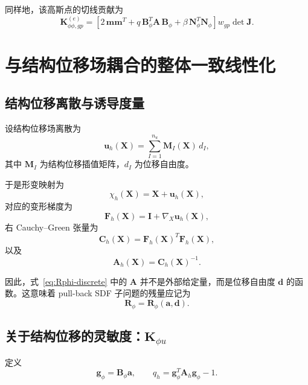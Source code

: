 \documentclass[12pt,a4paper]{ctexart}
\numberwithin{equation}{section}
\newcommand{\bA}{\bm{A}}
\newcommand{\bC}{\bm{C}}
\newcommand{\bF}{\bm{F}}
\newcommand{\bI}{\bm{I}}
\newcommand{\bg}{\bm{g}}
\newcommand{\bK}{\bm{K}}
\newcommand{\bR}{\bm{R}}
\newcommand{\bN}{\bm{N}}
\newcommand{\bB}{\bm{B}}
\newcommand{\bd}{\bm{d}}
\newcommand{\ba}{\bm{a}}
\newcommand{\bX}{\bm{X}}
\newcommand{\bu}{\bm{u}}
\newcommand{\gradX}{\nabla_{\!X}}
\begin{document}
同样地，该高斯点的切线贡献为
\begin{equation}
\boxed{
\bK_{\phi\phi,gp}^{(e)}
=
\left[
2\,\boldsymbol{m}\boldsymbol{m}^T + q\,\bB_\phi^T \bA\,\bB_\phi + \beta\,\bN_\phi^T\bN_\phi
\right]w_{gp}\det \bm{J}.
}
\label{eq:Kphiphi-gp}
\end{equation}

\section{与结构位移场耦合的整体一致线性化}\label{sec:coupling}

\subsection{结构位移离散与诱导度量}

设结构位移场离散为
\begin{equation}
\bu_h(\bX)=\sum_{I=1}^{n_u} \bm{M}_I(\bX)\, d_I,
\end{equation}
其中 $\bm{M}_I$ 为结构位移插值矩阵，$d_I$ 为位移自由度。

于是形变映射为
\begin{equation}
\chi_h(\bX)=\bX+\bu_h(\bX),
\end{equation}
对应的变形梯度为
\begin{equation}
\bF_h(\bX)=\bI+\gradX \bu_h(\bX),
\end{equation}
右 Cauchy--Green 张量为
\begin{equation}
\bC_h(\bX)=\bF_h(\bX)^T\bF_h(\bX),
\end{equation}
以及
\begin{equation}
\bA_h(\bX)=\bC_h(\bX)^{-1}.
\end{equation}

因此，式~\eqref{eq:Rphi-discrete} 中的 $\bA$ 并不是外部给定量，而是位移自由度 $\bd$ 的函数。这意味着 pull-back SDF 子问题的残量应记为
\begin{equation}
\bR_\phi = \bR_\phi(\ba,\bd).
\end{equation}

\subsection{关于结构位移的灵敏度：\texorpdfstring{$\bm{K}_{\phi u}$}{K_{\phi u}}}

定义
\begin{equation}
\bg_\phi = \bB_\phi \ba,
\qquad
q_h = \bg_\phi^T \bA_h \bg_\phi -1.
\end{equation}
\end{document}
